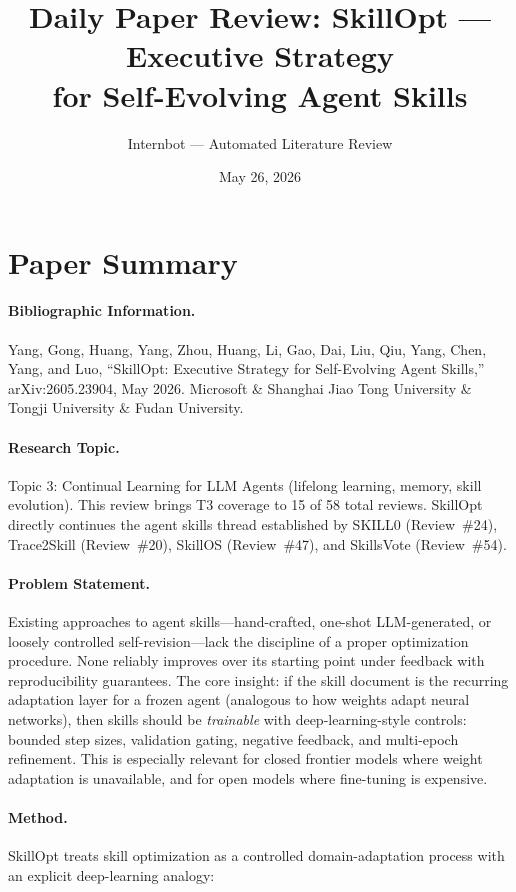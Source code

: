 \documentclass[11pt,a4paper]{article}
\title{Daily Paper Review: SkillOpt --- Executive Strategy\\for Self-Evolving Agent Skills}
\author{Internbot --- Automated Literature Review}
\date{May 26, 2026}
\begin{document}
\maketitle

\section*{Paper Summary}

\paragraph{Bibliographic Information.}
Yang, Gong, Huang, Yang, Zhou, Huang, Li, Gao, Dai, Liu, Qiu, Yang, Chen, Yang, and Luo, ``SkillOpt: Executive Strategy for Self-Evolving Agent Skills,'' arXiv:2605.23904, May 2026. Microsoft \& Shanghai Jiao Tong University \& Tongji University \& Fudan University.

\paragraph{Research Topic.}
Topic 3: Continual Learning for LLM Agents (lifelong learning, memory, skill evolution). This review brings T3 coverage to 15 of 58 total reviews. SkillOpt directly continues the agent skills thread established by SKILL0 (Review~\#24), Trace2Skill (Review~\#20), SkillOS (Review~\#47), and SkillsVote (Review~\#54).

\paragraph{Problem Statement.}
Existing approaches to agent skills---hand-crafted, one-shot LLM-generated, or loosely controlled self-revision---lack the discipline of a proper optimization procedure. None reliably improves over its starting point under feedback with reproducibility guarantees. The core insight: if the skill document is the recurring adaptation layer for a frozen agent (analogous to how weights adapt neural networks), then skills should be \emph{trainable} with deep-learning-style controls: bounded step sizes, validation gating, negative feedback, and multi-epoch refinement. This is especially relevant for closed frontier models where weight adaptation is unavailable, and for open models where fine-tuning is expensive.

\paragraph{Method.}
SkillOpt treats skill optimization as a controlled domain-adaptation process with an explicit deep-learning analogy:
\end{document}
